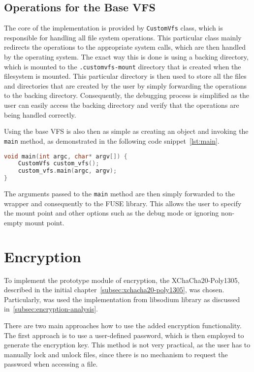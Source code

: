 \subsection{Operations for the Base VFS}\label{subsec:base-ops}

The core of the implementation is provided by \texttt{CustomVfs} class, which is responsible for handling all file system operations.
This particular class mainly redirects the operations to the appropriate system calls, which are then handled by the operating system.
The exact way this is done is using a backing directory, which is mounted to the \texttt{.customvfs-{mount}} directory that is created when the filesystem is mounted.
This particular directory is then used to store all the files and directories that are created by the user by simply forwarding the operations to the backing directory.
Consequently, the debugging process is simplified as the user can easily access the backing directory and verify that the operations are being handled correctly.

Using the base VFS is also then as simple as creating an object and invoking the \texttt{main} method, as demonstrated in the following code snippet~\ref{lst:main}.

\begin{lstlisting}[language=c++, basicstyle=\ttfamily\small, caption={Main method of the \texttt{CustomVfs} class}, label={lst:main}]
void main(int argc, char* argv[]) {
    CustomVfs custom_vfs();
    custom_vfs.main(argc, argv);
}
\end{lstlisting}

The arguments passed to the \texttt{main} method are then simply forwarded to the wrapper and consequently to the FUSE library.
This allows the user to specify the mount point and other options such as the debug mode or ignoring non-empty mount point.


\section{Encryption}\label{sec:encryption}

To implement the prototype module of encryption, the XChaCha20-Poly1305, described in the initial chapter~\ref{subsec:xchacha20-poly1305}, was chosen.
Particularly, was used the implementation from libsodium library as discussed in~\ref{subsec:encryption-analysis}.

There are two main approaches how to use the added encryption functionality.
The first approach is to use a user-defined password, which is then employed to generate the encryption key.
This method is not very practical, as the user has to manually lock and unlock files, since there is no mechanism to request the password when accessing a file.


